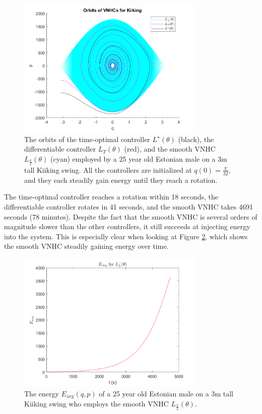 \begin{figure}
   \centering
   \includegraphics[width=0.8\textwidth]{images/kiiking_orbits.png}
   \caption{The orbits of the time-optimal controller \(L^\star(\theta)\)
      (black), the differentiable controller \(L_T(\theta)\) (red),
      and the smooth VNHC \(L_\frac{\pi}{2}(\theta)\) (cyan) employed by a 25
      year old Estonian male on a 3m tall Kiiking swing. All the controllers are
      initialized at \(q(0) = \frac{\pi}{32}\), and they each steadily gain
      energy until they reach a rotation.}
   \label{fig:vlp-sim-orbit}
\end{figure}

The time-optimal controller reaches a rotation within 18 seconds, the
differentiable controller rotates in 41 seconds, and
the smooth VNHC takes 4691 seconds (78 minutes).
Despite the fact that the smooth VNHC is several orders of magnitude slower than
the other controllers, it still succeeds at injecting energy into the
system.
This is especially clear when looking at Figure \ref{fig:vlp-sim-energy}, which
shows the smooth VNHC steadily gaining energy over time.

\begin{figure}
   \centering
   \includegraphics[width=0.8\textwidth]{images/E_kiiking_ltheta.png}
   \caption{The energy \(E_\text{avg}(q,p)\) of a 25 year old Estonian male on a
      3m tall Kiiking swing who employs the smooth VNHC
   \(L_\frac{\pi}{2}(\theta)\).}
   \label{fig:vlp-sim-energy}
\end{figure}

